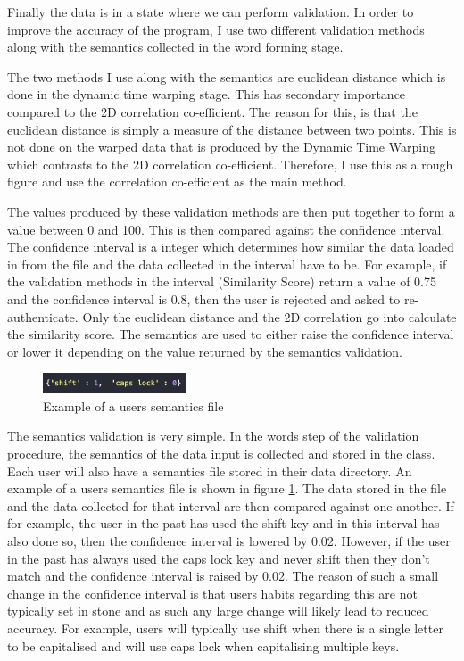 \documentclass[10pt,a4paper]{report}
\begin{document}
Finally the data is in a state where we can perform validation. In order to improve the accuracy of the program, I use two different validation methods along with the semantics collected in the word forming stage. 

The two methods I use along with the semantics are euclidean distance which is done in the dynamic time warping stage. This has secondary importance compared to the 2D correlation co-efficient. The reason for this, is that the euclidean distance is simply a measure of the distance between two points. This is not done on the warped data that is produced by the Dynamic Time Warping which contrasts to the 2D correlation co-efficient. Therefore, I use this as a rough figure and use the correlation co-efficient as the main method. 

The values produced by these validation methods are then put together to form a value between 0 and 100. This is then compared against the confidence interval. The confidence interval is a integer which determines how similar the data loaded in from the file and the data collected in the interval have to be. For example, if the validation methods in the interval (Similarity Score) return a value of 0.75 and the confidence interval is 0.8, then the user is rejected and asked to re-authenticate. Only the euclidean distance and the 2D correlation go into calculate the similarity score. The semantics are used to either raise the confidence interval or lower it depending on the value returned by the semantics validation.

\begin{figure}
	\begin{center}
		\includegraphics[width=0.38\textwidth]{SemanticsEx}
	\end{center}
	\caption{Example of a users semantics file}
	\label{fig:sem}
\end{figure}

The semantics validation is very simple. In the words step of the validation procedure, the semantics of the data input is collected and stored in the class. Each user will also have a semantics file stored in their data directory. An example of a users semantics file is shown in figure \ref{fig:sem}. The data stored in the file and the data collected for that interval are then compared against one another. If for example, the user in the past has used the shift key and in this interval has also done so, then the confidence interval is lowered by 0.02. However, if the user in the past has always used the caps lock key and never shift then they don't match and the confidence interval is raised by 0.02. The reason of such a small change in the confidence interval is that users habits regarding this are not typically set in stone and as such any large change will likely lead to reduced accuracy. For example, users will typically use shift when there is a single letter to be capitalised and will use caps lock when capitalising multiple keys. 
\end{document}
